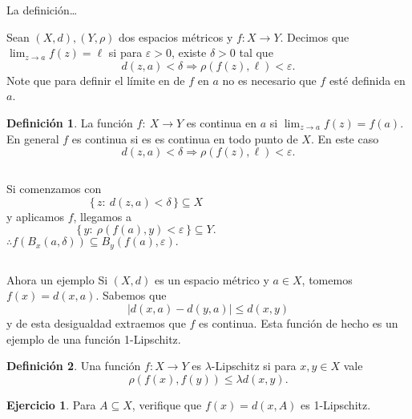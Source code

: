 \documentclass[utf8]{beamer}
\theoremstyle{plain}
\theoremstyle{definition}
\newtheorem{Def}{Definición}           %
\newtheorem{Ej}{Ejercicio}             %
\theoremstyle{remark}
\numberwithin{equation}{section}
\newcommand{\dl}{\delta}                %
\newcommand{\eps}{\varepsilon}          %
\newcommand{\la}{\lambda}               %
\newcommand{\set}[1]{\{\,#1\,\}}    %
\renewcommand{\l}{\ell}                   %
\renewcommand{\leq}{\leqslant}          %
\newcommand{\To}{\Rightarrow}
\begin{document}
\begin{frame}{La definición\dots}

    Sean $(X,d),(Y,\rho)$ dos espacios métricos y $f\colon X\to Y$. Decimos 
    que $\lim_{z\to a}f(z)=\l$ si para $\eps>0$, existe $\dl>0$ tal que 
    $$d(z,a)<\dl\To\rho(f(z),\l)<\eps.$$
    Note que para definir el l\'imite en de $f$ en $a$ no es necesario que $f$ est\'e definida en $a$.
    \begin{Def}\label{def:continudadEspMet}
    La funci\'on $f:\ X\to Y$ es \alert{continua} en $a$ si $\lim_{z\to a}f(z)=f(a)$. En general $f$ es continua si es es continua en todo punto de $X$. En este caso
    $$d(z,a)<\dl\To\rho(f(z),\l)<\eps.$$
    \end{Def}
    
\end{frame}

\begin{frame}
    \begin{columns}
        \begin{column}{0.5\textwidth}
            Si comenzamos con 
            $$\set{z:\ d(z,a)<\dl}\subseteq X$$
            y aplicamos $f$, llegamos a 
            $$\set{y:\ \rho(f(a),y)<\eps}\subseteq Y.$$
            $\therefore f(B_x(a,\dl))\subseteq B_y(f(a),\eps).$
        \end{column}
        
        \begin{column}{0.5\textwidth}
        \end{column}
    \end{columns}
\end{frame}

\begin{frame}{Ahora un ejemplo}
    Si $(X,d)$ es un espacio m\'etrico y $a\in X$, tomemos $f(x)=d(x,a)$. Sabemos que 
    $$|d(x,a)-d(y,a)|\leq d(x,y)$$
    y de esta desigualdad extraemos que $f$ es continua. Esta funci\'on de hecho es un ejemplo de una funci\'on 1-\alert{Lipschitz}.
    \begin{Def}\label{def:Lipschitz}
        Una funci\'on $f: X\to Y$ es $\la$-Lipschitz si para $x,y\in X$ vale
        $$\rho(f(x),f(y))\leq \la d(x,y).$$
    \end{Def}
    \begin{Ej}\label{ej:distConjEsLip}
        Para $A\subseteq X$, verifique que $f(x)=d(x,A)$ es 1-Lipschitz.
    \end{Ej}
\end{frame}
\end{document}
